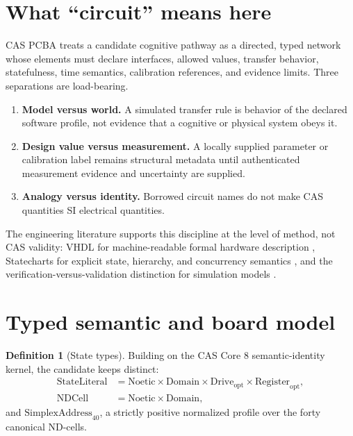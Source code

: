 \documentclass[11pt]{amsart}
\theoremstyle{definition}
\newtheorem{definition}[theorem]{Definition}
\theoremstyle{remark}
\begin{document}
\maketitle

\section{What ``circuit'' means here}

CAS PCBA treats a candidate cognitive pathway as a directed, typed network whose elements must declare interfaces, allowed values, transfer behavior, statefulness, time semantics, calibration references, and evidence limits. Three separations are load-bearing.

\begin{enumerate}
\item \textbf{Model versus world.} A simulated transfer rule is behavior of the declared software profile, not evidence that a cognitive or physical system obeys it.
\item \textbf{Design value versus measurement.} A locally supplied parameter or calibration label remains structural metadata until authenticated measurement evidence and uncertainty are supplied.
\item \textbf{Analogy versus identity.} Borrowed circuit names do not make CAS quantities SI electrical quantities.
\end{enumerate}

The engineering literature supports this discipline at the level of method, not CAS validity: VHDL for machine-readable formal hardware description \cite{vhdl}, Statecharts for explicit state, hierarchy, and concurrency semantics \cite{harel}, and the verification-versus-validation distinction for simulation models \cite{sargent}.

\section{Typed semantic and board model}

\begin{definition}[State types]\label{def:states}
Building on the CAS Core 8 semantic-identity kernel, the candidate keeps distinct:
\begin{align*}
\mathrm{StateLiteral} &= \mathrm{Noetic}\times\mathrm{Domain}\times\mathrm{Drive}_{\mathrm{opt}}\times\mathrm{Register}_{\mathrm{opt}},\\
\mathrm{NDCell} &= \mathrm{Noetic}\times\mathrm{Domain},
\end{align*}
and $\mathrm{SimplexAddress}_{40}$, a strictly positive normalized profile over the forty canonical ND-cells.
\end{definition}
\end{document}
